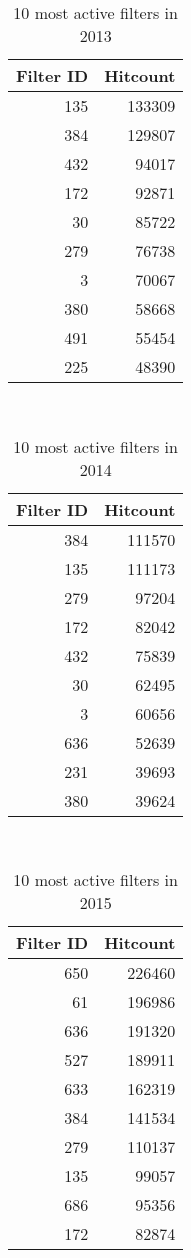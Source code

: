\documentclass{sigchi}
\begin{document}
\begin{table}
  \centering
  \begin{tabular}{r r }
    Filter ID & Hitcount \\
    \hline
    135 & 133309 \\
    384 & 129807 \\
    432 & 94017 \\
    172 & 92871 \\
    30 & 85722 \\
    279 & 76738 \\
    3 & 70067 \\
    380 & 58668 \\
    491 & 55454 \\
    225 & 48390 \\
  \end{tabular}
  \caption{10 most active filters in 2013}~\label{tab:most-active-2013}
\end{table}

\begin{table}
  \centering
  \begin{tabular}{r r }
    Filter ID & Hitcount \\
    \hline
    384 & 111570 \\
    135 & 111173 \\
    279 & 97204 \\
    172 & 82042 \\
    432 & 75839 \\
    30 & 62495 \\
    3 & 60656 \\
    636 & 52639 \\
    231 & 39693 \\
    380 & 39624 \\
  \end{tabular}
  \caption{10 most active filters in 2014}~\label{tab:most-active-2014}
\end{table}

\begin{table}
  \centering
  \begin{tabular}{r r }
    Filter ID & Hitcount \\
    \hline
    650 & 226460 \\
    61 & 196986 \\
    636 & 191320 \\
    527 & 189911 \\
    633 & 162319 \\
    384 & 141534 \\
    279 & 110137 \\
    135 & 99057 \\
    686 & 95356 \\
    172 & 82874 \\
  \end{tabular}
  \caption{10 most active filters in 2015}~\label{tab:most-active-2015}
\end{table}
\end{document}

